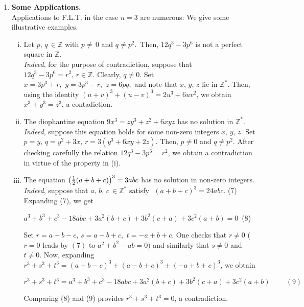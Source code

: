 \documentclass[11pt,a4paper]{article}
\begin{document}
\begin{enumerate}
\item \textbf{Some Applications.}\\
Applications to F.L.T. in the case $n=3$ are numerous: We give some illustrative examples.
\begin{enumerate}[(i)]
\item Let $p,\,q\,\in \mathbb{Z}$ with $p\neq\,0$ and $q\neq p^2.\,$ Then, $12q^3-3p^6$ is not a perfect square in $\mathbb{Z}$.\\
\textit{Indeed}, for the purpose of contradiction, suppose that $12q^3-3p^6=r^2,\,r\in \mathbb{Z}$. Clearly, $q\neq0$. Set $x=3p^3+r,\,\,y=3p^3-r,\,\,z=6pq,$ and note that $x,\,y,\,z$ lie in $\mathbb{Z}^*$. Then, using the identity $(u+v)^3+(u-v)^3=2u^3+6uv^2$, we obtain $x^3+y^3=z^3$, a contadiction.
\item The diophantine equation $9x^3=zy^3+z^2+6xyz$ has no solution in $\mathbb{Z}^*$.\\
\textit{Indeed}, suppose this equation holds for some non-zero integers $x,\,y,\,z$. Set $p=y,\,q=y^2+3x,\,r=3(y^3+6xy+2z)$. Then, $p\neq 0$ and $q\neq p^2$. After checking carefully the relation $12q^3-3p^6=r^2$, we obtain a contradiction in virtue of the property in (i).
\item The equation $\big{(} \frac{1}{2}(a+b+c)\big{)}^3=3abc$ has no solution in non-zero integers.\\
\textit{Indeed}, suppose that $a,\,b,\,c\,\in \mathbb{Z}^*$ satisfy\,\,\,\,$(a+b+c)^3=24abc$.\hspace*{0.5 cm} \hspace*{2.2cm}(7)\\ Expanding (7), we get \begin{center} $a^3+b^3+c^3-18abc+3a^2(b+c)+3b^2(c+a)+3c^2(a+b)=0$ \hspace{2.1cm}\,\;\;\;(8)\end{center}
Set $r=a+b-c,\,s=a-b+c,\,\,t=-a+b+c$. One checks that $r\neq 0$ ($r=0$ leads by $(7)$ to $a^2+b^2-ab=0)$ and similarly that $s\neq 0$ and $t\neq 0$. Now, expanding $r^3+s^3+t^3=(a+b-c)^3+(a-b+c)^3+(-a+b+c)^3$, we obtain \begin{center}$r^3+s^3+t^3=a^3+b^3+c^3-18abc+3a^2(b+c)+3b^2(c+a)+3c^2(a+b)\;\;\;\;\; \;\;\;(9)$\end{center}
Comparing (8) and (9) provides $r^3+s^3+t^3=0$, a contradiction.
\end{enumerate}
\end{enumerate}
\end{document}
